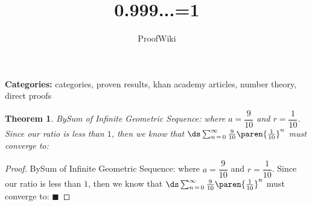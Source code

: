 \documentclass{article}
\title{0.999...=1}
\author{ProofWiki}
\date{}
\newtheorem{theorem}{Theorem}
\begin{document}
\maketitle

\noindent\textbf{Categories:} categories, proven results, khan academy articles, number theory, direct proofs

\begin{theorem}
BySum of Infinite Geometric Sequence: where $a = \dfrac 9 {10}$ and $r = \dfrac 1 {10}$. Since our ratio is less than $1$, then we know that $\ds \sum_{n \mathop = 0}^\infty \frac 9 {10} \paren {\frac 1 {10} }^n$ must converge to:
\end{theorem}

\begin{proof}
BySum of Infinite Geometric Sequence: where $a = \dfrac 9 {10}$ and $r = \dfrac 1 {10}$. Since our ratio is less than $1$, then we know that $\ds \sum_{n \mathop = 0}^\infty \frac 9 {10} \paren {\frac 1 {10} }^n$ must converge to: $\blacksquare$
\end{proof}
\end{document}
